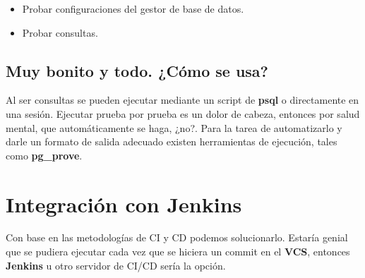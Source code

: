 \documentclass{article}
\begin{document}
\begin{itemize}
\begin{lstlisting}[
    backgroundcolor=\color{background},
    language=SQL,
    showspaces=false,
    basicstyle=\ttfamily,
    numbers=left,
    numberstyle=\tiny,
    commentstyle=\color{gray}
    ]
        SELECT has_column('public', 'tal01_alumno', 'tx_matricula', 
            'Probar que la tabla public.tal01_alumno tenga la columna tx_matricula');
        SELECT has_pk('public', 'tal01_alumno', 'Probar que la tabla public.tal01_alumno tenga pk');
        SELECT fk_ok(
            'public',
            'tal01_alumno',
            ARRAY['id_sexo'],
            'public',
            'tib14_sexo',
            ARRAY['id_sexo']
        );
        SELECT * FROM finish();
    ROLLBACK;
    \end{lstlisting}
    \item Probar configuraciones del gestor de base de datos.
    \item Probar consultas.
\end{itemize}
\subsection{Muy bonito y todo. ¿Cómo se usa?}
Al ser consultas se pueden ejecutar mediante un script de \textbf{psql} o directamente en una sesión. Ejecutar prueba por prueba es un dolor de cabeza, entonces por salud mental, que automáticamente se haga, ¿no?.
Para la tarea de automatizarlo y darle un formato de salida adecuado existen herramientas de ejecución, tales como \textbf{pg\_prove}.

\section{Integración con Jenkins}
 Con base en las metodologías de CI y CD podemos solucionarlo. Estaría genial que se pudiera ejecutar cada vez que se hiciera un commit en el \textbf{VCS}, entonces \textbf{Jenkins} u otro servidor de CI/CD sería la opción.
\end{document}
